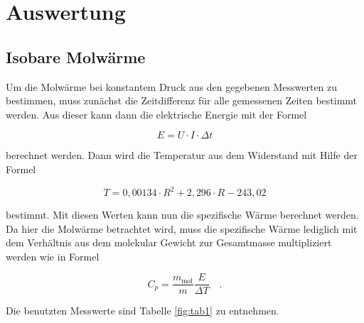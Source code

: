 \section{Auswertung}
\subsection{Isobare Molwärme}
Um die Molwärme bei konstantem Druck aus den gegebenen Messwerten zu bestimmen, muss zunächst die Zeitdifferenz für alle gemessenen Zeiten bestimmt werden. Aus dieser kann dann die elektrische Energie mit der Formel

\begin{equation}
E=U\cdot I\cdot\Delta t
\end{equation}

berechnet werden. Dann wird die Temperatur aus dem Widerstand mit Hilfe der Formel 

\begin{equation}
T=0,00134\cdot R^2+2,296\cdot R-243,02
\end{equation}

bestimmt. Mit diesen Werten kann nun die spezifische Wärme berechnet werden. Da hier die Molwärme betrachtet wird, muss die spezifische Wärme lediglich mit dem Verhältnis aus dem molekular Gewicht zur Gesamtmasse multipliziert werden wie in Formel

\begin{equation}
C_p=\frac{m_\text{mol}}{m}\frac{E}{\Delta T}\quad.
\end{equation}

\noindent Die benutzten Messwerte sind Tabelle \ref{fig:tab1} zu entnehmen.   

